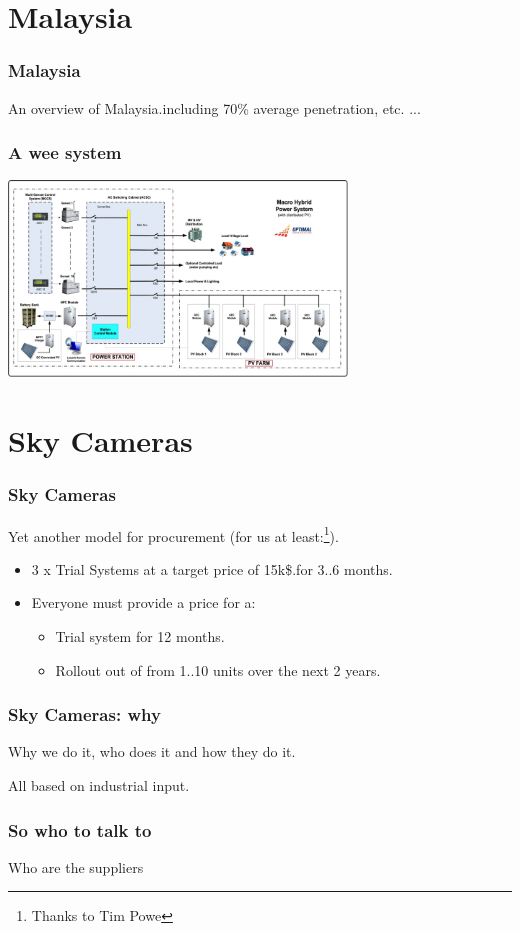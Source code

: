 \documentclass{beamer}
\begin{document}
\section{Malaysia}
\begin{frame}\frametitle{Malaysia}
An overview of Malaysia.including 70\% average penetration, etc. ...
\end{frame}

\begin{frame}\frametitle{A wee system}
\includegraphics[width=9cm]{optimal_power_macro_hybrid_mini_grid_line_diagram_ops.png}
\end{frame}

\section{Sky Cameras}

\begin{frame}\frametitle{Sky Cameras}
Yet another model for procurement (for us at least:\footnote{Thanks to
  Tim Powe}).
  \begin{itemize}
  \item 3 x Trial Systems at a target price of 15k\$.for 3..6 months.
    \pause
  \item Everyone must provide a price for a:
    \begin{itemize}
    \item Trial system for 12 months.
    \item Rollout out of from 1..10 units over the next 2 years.
    \end{itemize}
  \end{itemize}
\end{frame}

\begin{frame}\frametitle{Sky Cameras: why}
Why we do it, who does it and how they do it.

All based on industrial input.
\end{frame}

\begin{frame}\frametitle{So who to talk to}
Who are the suppliers
\end{frame}
\end{document}
